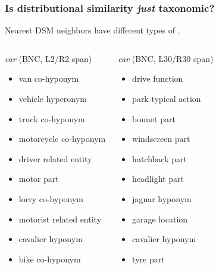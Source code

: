 \documentclass[t]{beamer} %
\begin{document}
\begin{frame}
  \frametitle{Is distributional similarity \textit{just} taxonomic?}

  \ungap[.5]
  Nearest DSM neighbors have different types of .

  \ungap[.5]\footnotesize
  \begin{columns}[t]
    \column{5cm}
    \begin{block}{\emph{car} {\small (BNC, L2/R2 span)}}
      \begin{itemize}
      \item van {\color{counterpoint} co-hyponym}
      \item vehicle {\color{counterpoint} hyperonym}
      \item truck {\color{counterpoint} co-hyponym}
      \item motorcycle {\color{counterpoint} co-hyponym}
      \item driver {\color{counterpoint} related entity}
      \item motor {\color{counterpoint} part}
      \item lorry {\color{counterpoint} co-hyponym}
      \item motorist {\color{counterpoint} related entity}
      \item cavalier {\color{counterpoint} hyponym}
      \item bike {\color{counterpoint} co-hyponym}
      \end{itemize}
    \end{block}
    \column{5cm}
    \begin{block} {\emph{car} {\small (BNC, L30/R30 span)}}
      \begin{itemize}
      \item drive {\color{counterpoint} function}
      \item park {\color{counterpoint} typical action}
      \item bonnet {\color{counterpoint} part}
      \item windscreen {\color{counterpoint} part}
      \item hatchback {\color{counterpoint} part}
      \item headlight {\color{counterpoint} part}
      \item jaguar {\color{counterpoint} hyponym}
      \item garage {\color{counterpoint} location}
      \item cavalier {\color{counterpoint} hyponym}
      \item tyre {\color{counterpoint} part}
      \end{itemize}
    \end{block}
  \end{columns}

  \hfill{}
\end{frame}
\end{document}
